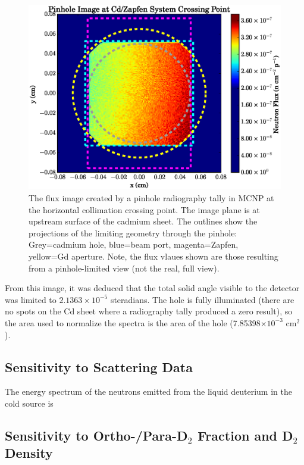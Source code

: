 \documentclass[preprint,12pt]{elsarticle}
\begin{document}
\begin{figure}[h!] 
  \centering
    \includegraphics[width=\textwidth]{graphics/pinhole.eps}
     \caption{The flux image created by a pinhole radiography tally in MCNP at the horizontal collimation crossing point.  The image plane is at upstream surface of the cadmium sheet.  The outlines show the projections of the limiting geometry through the pinhole: Grey=cadmium hole, blue=beam port, magenta=Zapfen, yellow=Gd aperture.  Note, the flux vlaues shown are those resulting from a pinhole-limited view (not the real, full view).  \label{fig:pinhole_image}}
\end{figure}

From this image, it was deduced that the total solid angle visible to the detector was limited to $2.1363\times10^{-5}$ steradians.  The hole is fully illuminated (there are no spots on the Cd sheet where a radiography tally produced a zero result), so the area used to normalize the spectra is the area of the hole (7.85398$\times 10^{-3}$ cm$^2$).

\subsection{Sensitivity to Scattering Data}
\label{subsec:data}

The energy spectrum of the neutrons emitted from the liquid deuterium in the cold source is 



\subsection{Sensitivity to Ortho-/Para-D$_2$ Fraction and D$_2$ Density}
\label{subsec:frac_den}
\end{document}

